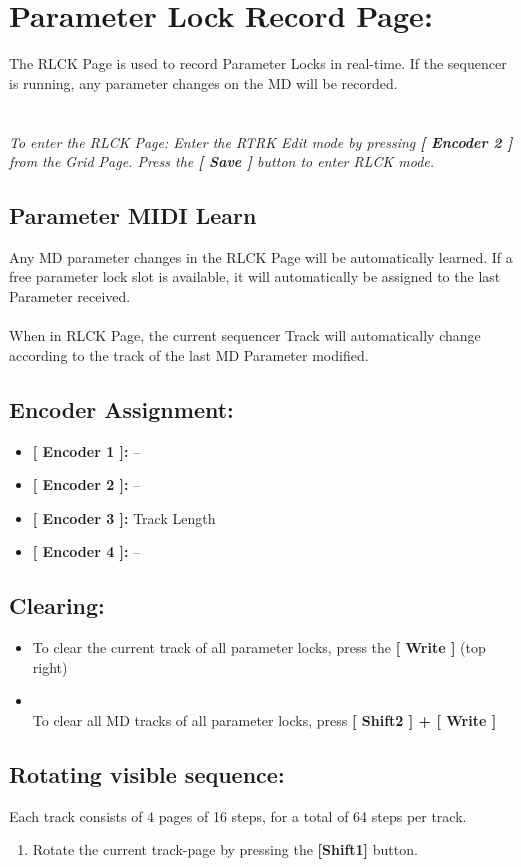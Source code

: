 \chapter{Parameter Lock Record  Page:}
The RLCK Page is used to record Parameter Locks in real-time. If the sequencer is running, any parameter changes on the MD will be recorded.\\
\\
\\
\textit{To enter the RLCK Page: Enter the RTRK Edit mode by pressing \textbf{[ Encoder 2 ]} from the Grid Page. Press the \textbf{[ Save ]} button to enter RLCK mode.}
\section{Parameter MIDI Learn}
Any MD parameter changes in the RLCK Page will be automatically learned. If a free parameter lock slot is available, it will automatically be assigned to the last Parameter received. \\
\\
When in RLCK Page, the current sequencer Track will automatically change according to the track of the last MD Parameter modified. 

\section{Encoder Assignment:}
\begin{itemize}
	\item \textbf{[ Encoder 1 ]: } --
	\item \textbf{[ Encoder 2 ]: } --
	\item \textbf{[ Encoder 3 ]: } Track Length
	\item \textbf{[ Encoder 4 ]: } --
\end{itemize}
\section{Clearing:}
\begin{itemize}
\item To clear the current track of all parameter locks, press the \textbf{[ Write ] }(top right)
\item \\To clear all MD tracks of all parameter locks,  press \textbf{[ Shift2 ] + [ Write ]}
\end{itemize}
\section{Rotating visible sequence:}
Each track consists of 4 pages of 16 steps, for a total of 64 steps per track.
\begin{enumerate}
	\item Rotate the current track-page by pressing the \textbf{[Shift1] }button.
\end{enumerate}
